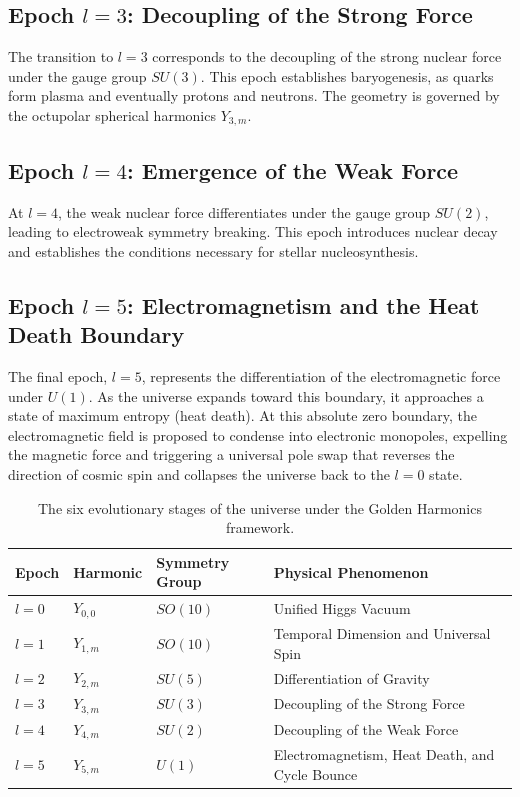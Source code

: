 \documentclass[11pt,twoside,a4paper]{article}
\begin{document}
\subsection{Epoch $l = 3$: Decoupling of the Strong Force}
The transition to $l=3$ corresponds to the decoupling of the strong nuclear force under the gauge group $SU(3)$. This epoch establishes baryogenesis, as quarks form plasma and eventually protons and neutrons. The geometry is governed by the octupolar spherical harmonics $Y_{3,m}$.

\subsection{Epoch $l = 4$: Emergence of the Weak Force}
At $l=4$, the weak nuclear force differentiates under the gauge group $SU(2)$, leading to electroweak symmetry breaking. This epoch introduces nuclear decay and establishes the conditions necessary for stellar nucleosynthesis.

\subsection{Epoch $l = 5$: Electromagnetism and the Heat Death Boundary}
The final epoch, $l=5$, represents the differentiation of the electromagnetic force under $U(1)$. As the universe expands toward this boundary, it approaches a state of maximum entropy (heat death). At this absolute zero boundary, the electromagnetic field is proposed to condense into electronic monopoles, expelling the magnetic force and triggering a universal pole swap that reverses the direction of cosmic spin and collapses the universe back to the $l=0$ state.

\begin{table}[h]
\centering
\begin{tabular}{llll}
\toprule
\textbf{Epoch} & \textbf{Harmonic} & \textbf{Symmetry Group} & \textbf{Physical Phenomenon} \\
\midrule
$l = 0$ & $Y_{0,0}$ & $SO(10)$ & Unified Higgs Vacuum \\
$l = 1$ & $Y_{1,m}$ & $SO(10)$ & Temporal Dimension and Universal Spin \\
$l = 2$ & $Y_{2,m}$ & $SU(5)$ & Differentiation of Gravity \\
$l = 3$ & $Y_{3,m}$ & $SU(3)$ & Decoupling of the Strong Force \\
$l = 4$ & $Y_{4,m}$ & $SU(2)$ & Decoupling of the Weak Force \\
$l = 5$ & $Y_{5,m}$ & $U(1)$ & Electromagnetism, Heat Death, and Cycle Bounce \\
\bottomrule
\end{tabular}
\caption{The six evolutionary stages of the universe under the Golden Harmonics framework.}
\label{tab:epochs}
\end{table}
\end{document}
